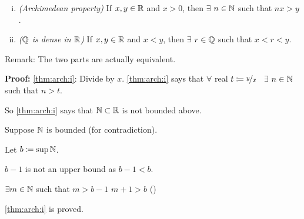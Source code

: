 \documentclass[10pt,aspectratio=169]{beamer}
\begin{document}
\begin{frame}
\begin{theorem}
\leavevmode
\begin{enumerate}[(i)]
\item \label{thm:arch:i} \emph{(Archimedean property)}
If $x, y \in {\mathbb{R}}$ and
$x > 0$, then $\exists$ $n \in {\mathbb{N}}$ such that
$nx > y$.
\pause
\item \label{thm:arch:ii} \emph{(${\mathbb{Q}}$ is dense in ${\mathbb{R}}$)}
If $x, y \in {\mathbb{R}}$ and $x < y$, then $\exists$ $r \in {\mathbb{Q}}$ such that
$x < r < y$.
\end{enumerate}
\end{theorem}

\pause

Remark: The two parts are actually equivalent.

\medskip
\pause

\textbf{Proof:} \eqref{thm:arch:i}:
\pause
\quad
Divide by $x$.
\pause
\quad
\eqref{thm:arch:i} says that $\forall$ real $t\coloneqq \nicefrac{y}{x}$
~$\exists$ $n \in {\mathbb{N}}$ such that $n > t$.

\medskip
\pause

So \eqref{thm:arch:i} says that ${\mathbb{N}} \subset {\mathbb{R}}$ is not bounded above.

\medskip
\pause

Suppose ${\mathbb{N}}$ is bounded (for contradiction).

\medskip
\pause

Let $b \coloneqq \sup {\mathbb{N}}$.

\medskip
\pause

$b-1$ is not an upper bound as $b-1 < b$.

\medskip
\pause

\thus \quad
$\exists m \in {\mathbb{N}}$ such that $m > b-1$
\pause
\wthus $m+1 > b$ (\contradiction)

\medskip
\pause
\eqref{thm:arch:i} is proved. 
\end{frame}
\end{document}
